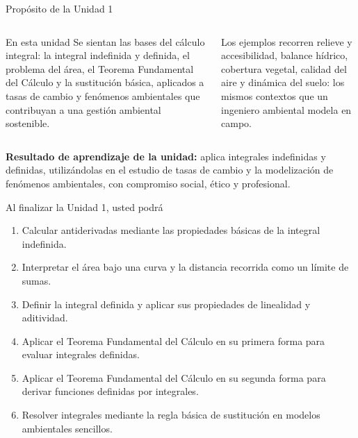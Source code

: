 \documentclass[aspectratio=169,11pt]{beamer}
\begin{document}
\begin{frame}{Propósito de la Unidad 1}
\small
\begin{columns}[T,onlytextwidth]
\begin{block}{En esta unidad}
Se sientan las bases del cálculo integral: la integral indefinida y definida, el problema del área, el Teorema Fundamental del Cálculo y la sustitución básica, aplicados a tasas de cambio y fenómenos ambientales que contribuyan a una gestión ambiental sostenible.
\end{block}
\begin{envbox}
Los ejemplos recorren relieve y accesibilidad, balance hídrico, cobertura vegetal, calidad del aire y dinámica del suelo: los mismos contextos que un ingeniero ambiental modela en campo.
\end{envbox}
\end{columns}
\vspace{0.02cm}
\begin{keybox}[top=2pt,bottom=2pt]
\footnotesize\textbf{Resultado de aprendizaje de la unidad:} aplica integrales indefinidas y definidas, utilizándolas en el estudio de tasas de cambio y la modelización de fenómenos ambientales, con compromiso social, ético y profesional.
\end{keybox}
\end{frame}

\begin{frame}{Al finalizar la Unidad 1, usted podrá}
\small
\begin{enumerate}
  \item Calcular antiderivadas mediante las propiedades básicas de la integral indefinida.
  \item Interpretar el área bajo una curva y la distancia recorrida como un límite de sumas.
  \item Definir la integral definida y aplicar sus propiedades de linealidad y aditividad.
  \item Aplicar el Teorema Fundamental del Cálculo en su primera forma para evaluar integrales definidas.
  \item Aplicar el Teorema Fundamental del Cálculo en su segunda forma para derivar funciones definidas por integrales.
  \item Resolver integrales mediante la regla básica de sustitución en modelos ambientales sencillos.
\end{enumerate}
\end{frame}
\end{document}
